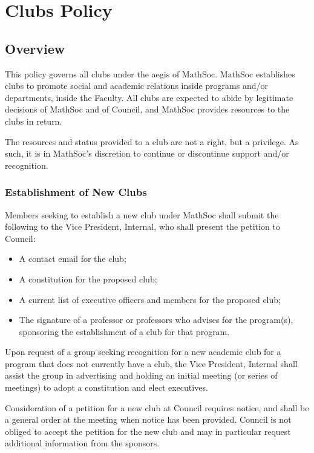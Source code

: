 \section{Clubs Policy}
\subsection{Overview}
This policy governs all clubs under the aegis of MathSoc. MathSoc establishes
clubs to promote social and academic relations inside programs and/or
departments, inside the Faculty. All clubs are expected to abide by legitimate
decisions of MathSoc and of Council, and MathSoc provides resources to the clubs
in return.

The resources and status provided to a club are not a right, but a privilege.
As such, it is in MathSoc's discretion to continue or discontinue support and/or
recognition.

\subsubsection{Establishment of New Clubs}
Members seeking to establish a new club under MathSoc shall submit the following
to the Vice President, Internal, who shall present the petition to Council:

\begin{itemize}
  \item A contact email for the club;
  \item A constitution for the proposed club;
  \item A current list of executive officers and members for the proposed club;
  \item The signature of a professor or professors who advises for the
	  program(s), sponsoring the establishment of a club for that program.
\end{itemize}

Upon request of a group seeking recognition for a new academic club for a
program that does not currently have a club, the Vice President, Internal shall assist the
group in advertising and holding an initial meeting (or series of meetings) to
adopt a constitution and elect executives.

Consideration of a petition for a new club at Council requires notice, and shall
be a general order at the meeting when notice has been provided. Council is not
obliged to accept the petition for the new club and may in particular request
additional information from the sponsors.

